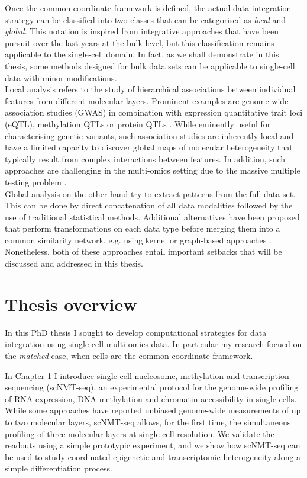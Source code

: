 Once the common coordinate framework is defined, the actual data integration strategy can be classified into two classes that can be categorised as \textit{local} and \textit{global}. This notation is inspired from integrative approaches that have been pursuit over the last years at the bulk level\cite{Ritchie2015}, but this classification remains applicable to the single-cell domain. In fact, as we shall demonstrate in this thesis, some methods designed for bulk data sets can be applicable to single-cell data with minor modifications.\\
Local analysis refers to the study of hierarchical associations between individual features from different molecular layers. Prominent examples are genome-wide association studies (GWAS) in combination with expression quantitative trait loci (eQTL), methylation QTLs or protein QTLs \cite{VanDerWijst2018,Chen2016,Pierce2018,Bonder2016}. While eminently useful for characterising genetic variants, such association studies are inherently local and have a limited capacity to discover global maps of molecular heterogeneity that typically result from complex interactions between features. In addition, such approaches are challenging in the multi-omics setting due to the massive multiple testing problem \cite{Sul2015}.\\
Global analysis on the other hand try to extract patterns from the full data set. This can be done by direct concatenation of all data modalities followed by the use of traditional statistical methods. Additional alternatives have been proposed that perform transformations on each data type before merging them into a common similarity network, e.g. using kernel or graph-based approaches \cite{Lanckriet2004, Wang2014}. Nonetheless, both of these approaches entail important setbacks that will be discussed and addressed in this thesis.

\section{Thesis overview}

In this PhD thesis I sought to develop computational strategies for data integration using single-cell multi-omics data. In particular my research focued on the \textit{matched} case, when cells are the common coordinate framework.

In Chapter 1 I introduce single-cell nucleosome, methylation and transcription sequencing (scNMT-seq), an experimental protocol for the genome-wide profiling of RNA expression, DNA methylation and chromatin accessibility in single cells. While some approaches have reported unbiased genome-wide measurements of up to two molecular layers, scNMT-seq allows, for the first time, the simultaneous profiling of three molecular layers at single cell resolution. We validate the readouts using a simple prototypic experiment, and we show how scNMT-seq can be used to study coordinated epigenetic and transcriptomic heterogeneity along a simple differentiation process.

